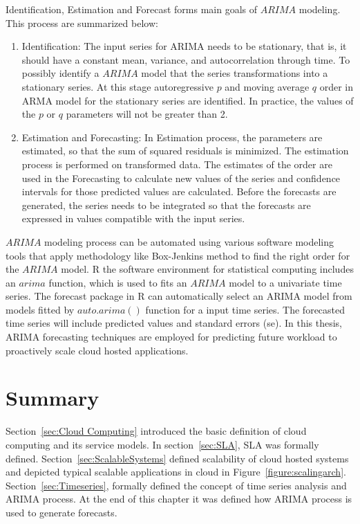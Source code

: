 Identification, Estimation and Forecast forms main goals of $ARIMA$ modeling. This process are summarized below:
\begin{enumerate}
  \item Identification: The input series for ARIMA needs to be stationary, that is, it should have a constant mean, variance, and autocorrelation through time. To possibly identify a $ARIMA$ model that the series transformations into a stationary series. At this stage autoregressive $p$ and moving average $q$ order in ARMA model for the stationary series are identified. In practice, the values of the $p$ or $q$ parameters will not be greater than 2.
 \item Estimation and Forecasting: In Estimation process, the parameters are estimated, so that the sum of squared residuals is minimized. The estimation process is performed on transformed data. The estimates of the order are used in the Forecasting to calculate new values of the series and confidence intervals for those predicted values are calculated. Before the forecasts are generated, the series needs to be integrated so that the forecasts are expressed in values compatible with the input series.
\end{enumerate}
$ARIMA$ modeling process can be automated using various software modeling tools that apply methodology like Box-Jenkins method to find the right order for the $ARIMA$ model. R the software environment for statistical computing includes an \(arima\) function, which is used to fits an $ARIMA$ model to a univariate time series. The forecast package in R can automatically select an ARIMA model from models fitted by \(auto.arima()\) function for a input time series. The forecasted time series will include predicted values and standard errors (se). In this thesis, ARIMA forecasting techniques are employed for predicting future workload to proactively scale cloud hosted applications.
\section{Summary}
\label{sec:Summary}
Section~\ref{sec:Cloud Computing} introduced the basic definition of cloud computing and its service models. In section~\ref{sec:SLA}, SLA was formally defined. Section~\ref{sec:ScalableSystems} defined scalability of cloud hosted systems and depicted typical scalable applications in cloud in Figure~\ref{figure:scalingarch}.
Section~\ref{sec:Timeseries}, formally defined the concept of time series analysis and ARIMA process. At the end of this chapter it was defined how ARIMA process is used to generate forecasts.
